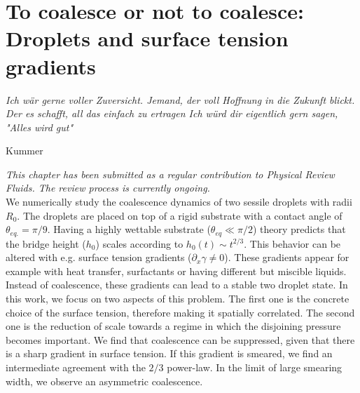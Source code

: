 \chapter{To coalesce or not to coalesce: Droplets and surface tension gradients}
\label{chapter:fifth_paper}
\epigraph{\textit{Ich wär gerne voller Zuversicht. Jemand, der voll Hoffnung in die Zukunft blickt. Der es schafft, all das einfach zu ertragen
Ich würd dir eigentlich gern sagen, "Alles wird gut"}}{Kummer}

\textit{\small{This chapter has been submitted as a regular contribution to Physical Review Fluids. The review process is currently ongoing.}}
\\

We numerically study the coalescence dynamics of two sessile droplets with radii $R_0$.
The droplets are placed on top of a rigid substrate with a contact angle of $\theta_{eq.} = \pi/9$. 
Having a highly wettable substrate ($\theta_{eq} \ll \pi/2$) theory predicts that the bridge height ($h_0$) scales according to $h_0(t) \sim t^{2/3}.$
This behavior can be altered with e.g. surface tension gradients ($\partial_x\gamma \neq 0$). 
These gradients appear for example with heat transfer, surfactants or having different but miscible liquids.
Instead of coalescence, these gradients can lead to a stable two droplet state. 
In this work, we focus on two aspects of this problem.
The first one is the concrete choice of the surface tension, therefore making it spatially correlated.
The second one is the reduction of scale towards a regime in which the disjoining pressure becomes important. 
We find that coalescence can be suppressed, given that there is a sharp gradient in surface tension.
If this gradient is smeared, we find an intermediate agreement with the $2/3$ power-law.
In the limit of large smearing width, we observe an asymmetric coalescence.

